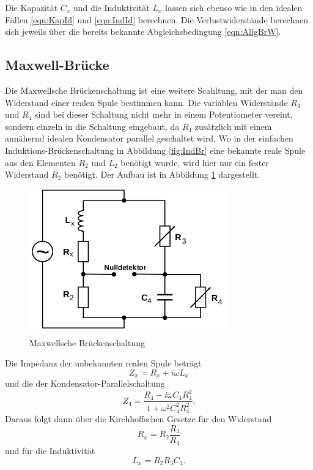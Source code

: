 Die Kapazität $C_x$ und die Induktivität $L_x$ lassen sich ebenso wie
in den idealen Fällen \eqref{eqn:KapId} und \eqref{eqn:IndId} berechnen.
Die Verlustwiderstände berechnen sich jeweils über die bereits bekannte
Abgleichsbedingung \eqref{eqn:AllgBrW}.


\subsection{Maxwell-Brücke}

Die Maxwellsche Brückenschaltung ist eine weitere Scahltung, mit der man
den Widerstand einer realen Spule bestimmen kann.
Die variablen Widerstände $R_3$ und $R_4$ sind bei dieser Schaltung nicht mehr
in einem Potentiometer vereint, sondern einzeln in die Schaltung eingebaut,
da $R_4$ zusätzlich mit einem annähernd idealen Kondensator
parallel geschaltet wird.
Wo in der einfachen Induktions-Brückenschaltung in Abbildung \ref{fig:IndBr}
eine bekannte reale Spule aus den Elementen $R_2$ und $L_2$ benötigt wurde,
wird hier nur ein fester Widerstand $R_2$ benötigt. Der Aufbau ist in
Abbildung \ref{fig:MaxBr} dargestellt.

\begin{figure}[h]
  \centering
  \includegraphics[height=6.25cm]{MaxBr.png}
  \caption{Maxwellsche Brückenschaltung}
  \label{fig:MaxBr}
\end{figure}

Die Impedanz der unbekannten realen Spule beträgt
\begin{equation}
  Z_x = R_x + i\omega L_x
\end{equation}
und die der Kondensator-Parallelschaltung
\begin{equation}
  Z_4 = \frac{R_4 - i\omega C_4R_4^2}{1 + \omega^2 C_4^2R_4^2} .
\end{equation}
Daraus folgt dann über die Kirchhoffschen Gesetze für den Widerstand
\begin{equation}
  R_x = R_2 \frac{R_3}{R_4}
\end{equation}
und für die Induktivität
\begin{equation}
  L_x = R_2 R_3 C_4 .
\end{equation}


